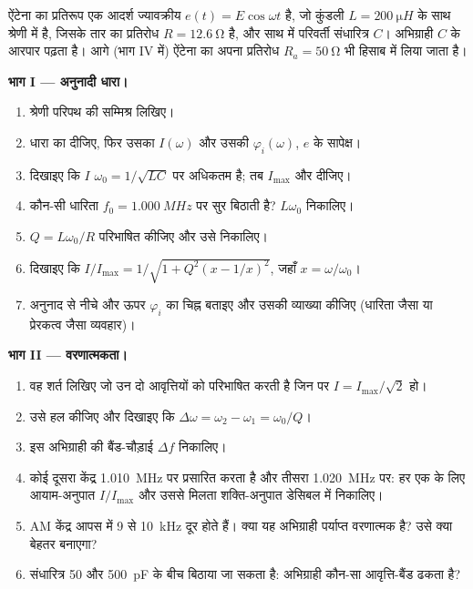 \begin{problem}
\label{pb:b1:sinusoidal-impedance:1}
ऐंटेना का प्रतिरूप एक आदर्श ज्यावक्रीय  $e(t) = E\cos\omega t$ है,
जो कुंडली $L = \qty{200}{\micro H}$ के साथ श्रेणी में है, जिसके तार का
प्रतिरोध $R = \qty{12.6}{\ohm}$ है, और साथ में परिवर्ती संधारित्र $C$।
अभिग्राही $C$ के आरपार  पढ़ता है। आगे (भाग IV में) ऐंटेना का
अपना प्रतिरोध $R_a = \qty{50}{\ohm}$ भी हिसाब में लिया जाता है।

\medskip
\noindent\textbf{भाग I --- अनुनादी धारा।}
\begin{enumerate}
  \item श्रेणी परिपथ की सम्मिश्र  लिखिए।
  \item धारा का  दीजिए, फिर उसका 
        $I(\omega)$ और उसकी  $\varphi_i(\omega)$, $e$ के सापेक्ष।
  \item दिखाइए कि $I$ $\omega_0 = 1/\sqrt{LC}$ पर अधिकतम है; तब
        $I_{\max}$ और  दीजिए।
  \item कौन-सी धारिता $f_0 = \qty{1.000}{MHz}$ पर सुर बिठाती है?
        $L\omega_0$ निकालिए।
  \item $Q = L\omega_0/R$ परिभाषित कीजिए और उसे निकालिए।
  \item दिखाइए कि $I/I_{\max} = 1/\sqrt{1 + Q^2(x - 1/x)^2}$, जहाँ
        $x = \omega/\omega_0$।
  \item अनुनाद से नीचे और ऊपर $\varphi_i$ का चिह्न बताइए और उसकी व्याख्या
        कीजिए (धारिता जैसा या प्रेरकत्व जैसा व्यवहार)।
\end{enumerate}

\medskip
\noindent\textbf{भाग II --- वरणात्मकता।}
\begin{enumerate}[resume]
  \item वह शर्त लिखिए जो उन दो आवृत्तियों को परिभाषित करती है जिन पर
        $I = I_{\max}/\sqrt2$ हो।
  \item उसे हल कीजिए और दिखाइए कि $\Delta\omega = \omega_2 - \omega_1 =
        \omega_0/Q$।
  \item इस अभिग्राही की बैंड-चौड़ाई $\Delta f$ निकालिए।
  \item कोई दूसरा केंद्र \qty{1.010}{MHz} पर प्रसारित करता है और तीसरा
        \qty{1.020}{MHz} पर: हर एक के लिए आयाम-अनुपात $I/I_{\max}$ और
        उससे मिलता शक्ति-अनुपात डेसिबल में निकालिए।
  \item AM केंद्र आपस में \qty{9}{} से \qty{10}{kHz} दूर होते हैं। क्या यह
        अभिग्राही पर्याप्त वरणात्मक है? उसे क्या बेहतर बनाएगा?
  \item संधारित्र \qty{50}{} और \qty{500}{pF} के बीच बिठाया जा सकता है:
        अभिग्राही कौन-सा आवृत्ति-बैंड ढकता है?
\end{enumerate}


\end{problem}

